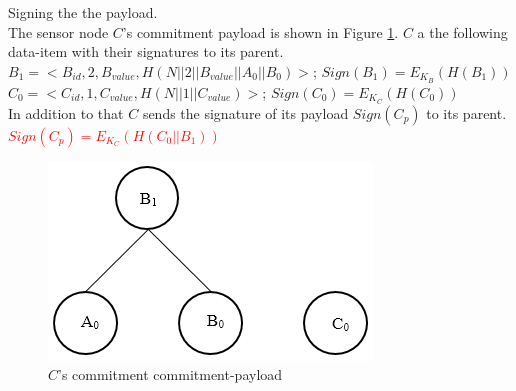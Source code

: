 		\begin{exmp}
		Signing the the payload.\\	
		The sensor node $C$'s commitment payload is shown in Figure \ref{fig:Commitment payload of C}.
		$C$ a the following data-item with their signatures to its parent.\\
		$B_{1} = <B_{id}, 2, B_{value}, H(N||2||B_{value}||A_{0}||B_{0})>$; $Sign(B_{1}) = E_{K_{B}}(H(B_{1}))$\\
		$C_{0} = <C_{id}, 1, C_{value}, H(N||1||C_{value})>$; $Sign(C_{0}) = E_{K_{C}}(H(C_{0}))$\\
		In addition to that $C$ sends the signature of its payload $Sign(C_{p})$ to its parent.\\
		\textcolor{red}{$Sign(C_{p}) = E_{K_{C}}(H(C_{0} || B_{1}))$}
			\begin{figure}[h!]
				\centering
				\includegraphics[scale = 0.5]{images/commitment-payload-of-C.png}
				\caption{$C$'s commitment commitment-payload}
				\label{fig:Commitment payload of C}
			\end{figure}
		\end{exmp}

